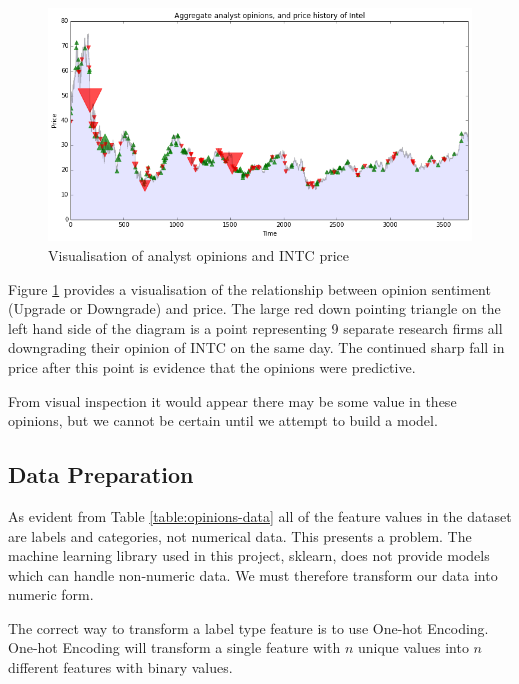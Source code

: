 \documentclass{report}
\begin{document}
\begin{figure}[H]
	\caption{Visualisation of analyst opinions and INTC price}
	\centerline{\includegraphics[scale=0.5]{vis/analyst_opinions.png}}
	\label{fig:opinions_vis}
\end{figure} 

Figure \ref{fig:opinions_vis} provides a visualisation of the relationship between opinion sentiment (Upgrade or Downgrade) and price. The large red down pointing triangle on the left hand side of the diagram is a point representing 9 separate research firms all downgrading their opinion of INTC on the same day. The continued sharp fall in price after this point is evidence that the opinions were predictive.

From visual inspection it would appear there may be some value in these opinions, but we cannot be certain until we attempt to build a model.

\subsection{Data Preparation}

As evident from Table \ref{table:opinions-data} all of the feature values in the dataset are labels and categories, not numerical data. This presents a problem. The machine learning library used in this project, sklearn, does not provide models which can handle non-numeric data. We must therefore transform our data into numeric form.

The correct way to transform a label type feature is to use One-hot Encoding. One-hot Encoding will transform a single feature with $n$ unique values into $n$ different features with binary values.
\end{document}
